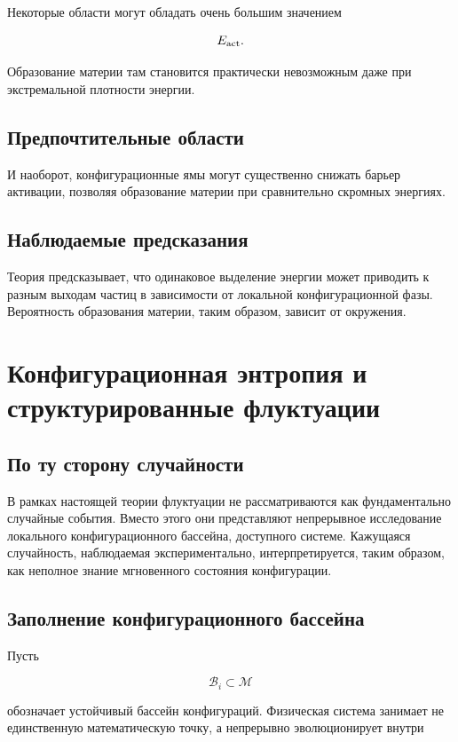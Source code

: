 Некоторые области могут обладать очень большим значением

\[ E_{\rm act}. \]

Образование материи там становится практически невозможным даже при экстремальной плотности энергии.

\section{Предпочтительные области}

И наоборот, конфигурационные ямы могут существенно снижать барьер активации, позволяя образование материи при сравнительно скромных энергиях.

\section{Наблюдаемые предсказания}

Теория предсказывает, что одинаковое выделение энергии может приводить к разным выходам частиц в зависимости от локальной конфигурационной фазы. Вероятность образования материи, таким образом, зависит от окружения.

\chapter{Конфигурационная энтропия и структурированные флуктуации}

\section{По ту сторону случайности}

В рамках настоящей теории флуктуации не рассматриваются как фундаментально случайные события. Вместо этого они представляют непрерывное исследование локального конфигурационного бассейна, доступного системе. Кажущаяся случайность, наблюдаемая экспериментально, интерпретируется, таким образом, как неполное знание мгновенного состояния конфигурации.

\section{Заполнение конфигурационного бассейна}

Пусть

\[ \mathcal B_i \subset \mathcal M \]

обозначает устойчивый бассейн конфигураций. Физическая система занимает не единственную математическую точку, а непрерывно эволюционирует внутри


